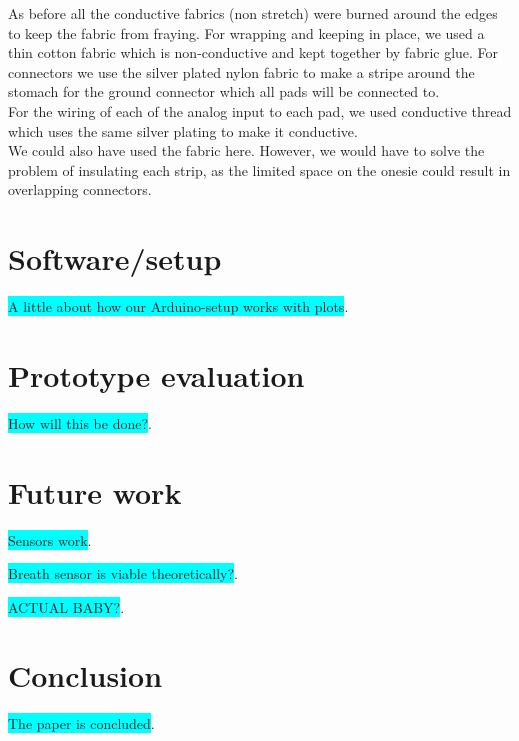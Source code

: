 \documentclass{sigchi-ext}
\begin{document}
As before all the conductive fabrics (non stretch) were 
burned around the edges to keep the fabric from fraying.
For wrapping and keeping in place, we used a thin cotton 
fabric which is non-conductive and kept together by
fabric glue.
For connectors we use the silver plated nylon fabric to make a stripe around
the stomach for the ground connector which all pads will be connected to.\\
For the wiring of each of the analog input to each pad, we used conductive thread
which uses the same silver plating to make it conductive.\\
We could also have used the fabric here. However, we would have to solve the problem
of insulating each strip, as the limited space on the onesie could result in overlapping
connectors.



\clearpage

\section{Software/setup}
\colorbox{cyan}{A little about how our Arduino-setup works with plots}.


\section{Prototype evaluation}
\colorbox{cyan}{How will this be done?}.

\section{Future work}
\colorbox{cyan}{Sensors work}.

\colorbox{cyan}{Breath sensor is viable theoretically?}.

\colorbox{cyan}{ACTUAL BABY?}.

\section{Conclusion}
\colorbox{cyan}{The paper is concluded}.




\balance{} 



\end{document}
